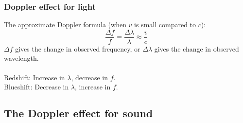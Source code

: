 \documentclass[a4paper,12pt]{article}
\begin{document}
\subsubsection*{Doppler effect for light}
The approximate Doppler formula (when $v$ is small compared to $c$):
\[\dfrac{\Delta f}{f}=\dfrac{\Delta \lambda}{\lambda}\approx\dfrac{v}{c}\]
$\Delta f$ gives the change in observed frequency, or $\Delta\lambda$ gives the change in observed wavelength.\\\\
Redshift: Increase in $\lambda$, decrease in $f$.\\
Blueshift: Decrease in $\lambda$, increase in $f$.
\subsection{The Doppler effect for sound} 
\end{document}
